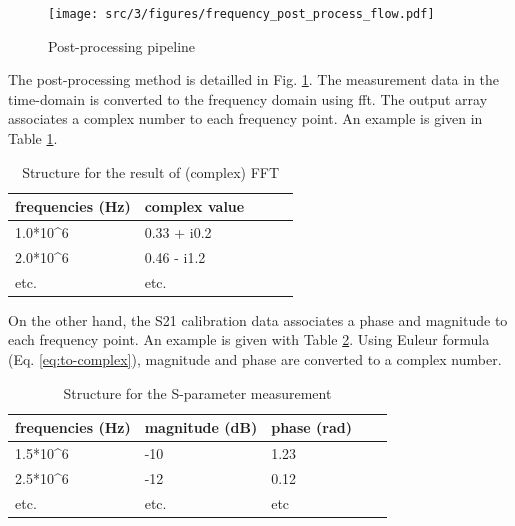 \begin{figure}[!h]
  \centering
  \texttt{[image: src/3/figures/frequency\_post\_process\_flow.pdf]}
  \caption{Post-processing pipeline}
  \label{fig:postprocess-nfs-pipeline}
\end{figure}

The post-processing method is detailled in Fig. \ref{fig:postprocess-nfs-pipeline}.
The measurement data in the time-domain is converted to the frequency domain using \gls{fft}.
The output array associates a complex number to each frequency point.
An example is given in Table \ref{tab:complex-fft}.

\begin{table}[!h]
  \centering
  \begin{tabular}{@{}lllll@{}}
  \toprule
  frequencies (Hz)        & complex value                \\ \midrule
  1.0*10^6                & 0.33 + i0.2                  \\
  2.0*10^6                & 0.46 - i1.2                  \\
  etc.                    & etc.                         \\ \bottomrule
  \end{tabular}
  \caption{Structure for the result of (complex) FFT}
  \label{tab:complex-fft}
\end{table}

On the other hand, the S21 calibration data associates a phase and magnitude to each frequency point.
An example is given with Table \ref{tab:sparams}.
Using Euleur formula (Eq. \ref{eq:to-complex}), magnitude and phase are converted to a complex number.

\begin{table}[!h]
  \centering
  \begin{tabular}{@{}lllll@{}}
  \toprule
  frequencies (Hz)          & magnitude (dB)         & phase (rad)     \\ \midrule
  1.5*10^6                  & -10                    & 1.23            \\
  2.5*10^6                  & -12                    & 0.12            \\
  etc.                      & etc.                   & etc             \\ \bottomrule
  \end{tabular}
  \caption{Structure for the S-parameter measurement}
  \label{tab:sparams}
\end{table}

